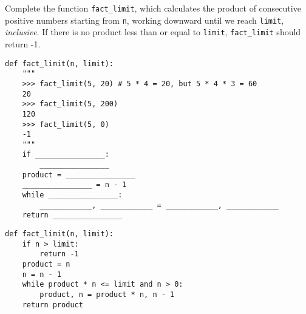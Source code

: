 \question Complete the function \lstinline{fact_limit}, which calculates the product of consecutive positive numbers starting from \lstinline{n}, working downward until we reach \lstinline{limit}, \textit{inclusive}. If there is no product less than or equal to \lstinline{limit}, \lstinline{fact_limit} should return -1.

\begin{blocksection}
\begin{lstlisting}
def fact_limit(n, limit):
    """
    >>> fact_limit(5, 20) # 5 * 4 = 20, but 5 * 4 * 3 = 60
    20
    >>> fact_limit(5, 200)
    120
    >>> fact_limit(5, 0)
    -1
    """
    if ________________:
        ________________
    product = ________________
    ________________ = n - 1
    while ________________:
        ____________, ____________ = ____________, ____________
    return ________________

\end{lstlisting}
\end{blocksection}

\begin{blocksection}
\begin{solution}
\begin{lstlisting}
def fact_limit(n, limit):
    if n > limit:
        return -1
    product = n
    n = n - 1
    while product * n <= limit and n > 0:
        product, n = product * n, n - 1
    return product
\end{lstlisting}
\end{solution}
\end{blocksection}